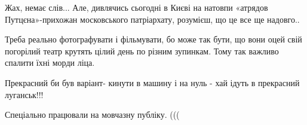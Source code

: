 \begin{itemize}
 
Жах, немає слів...
Але, дивлячись сьогодні в Києві на натовпи «атрядов Путцєна»-прихожан московського патріархату, розумієш, що це все ще надовго..

 

Треба реально фотографувати і фільмувати, бо може так бути, що вони оцей свій
погорілий театр крутять цілий день по різним зупинкам. Тому так важливо спалити
їхні морди ліца.


 
Прекрасний би був варіант- кинути в машину і на нуль - хай ідуть в прекрасний луганськ!!!

 
Спеціально працювали на мовчазну публіку. (((

\end{itemize}

